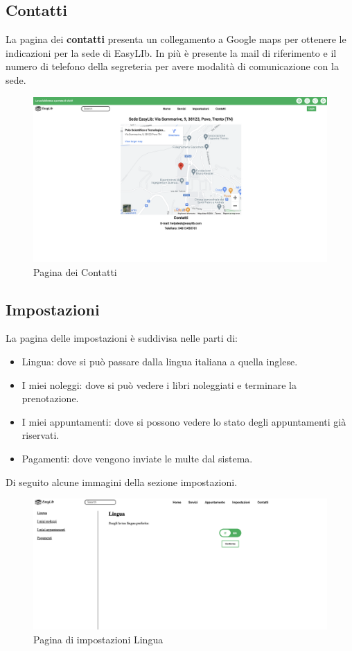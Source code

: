 \documentclass{article}
\begin{document}
\subsection{Contatti}
La pagina dei \textbf{contatti} presenta un collegamento a Google maps per ottenere le indicazioni per la sede di EasyLIb. In più è presente la mail di riferimento e il numero di telefono della segreteria per avere modalità di  comunicazione con la sede.

\begin{figure}[H]
    \centering
    \includegraphics[width=130mm]{D4/Images/Contatti.png}
    \caption{Pagina dei Contatti}
\end{figure}
\subsection{Impostazioni} La pagina delle impostazioni è suddivisa nelle parti di:
\begin{itemize}
    \item Lingua: dove si può passare dalla lingua italiana a quella inglese.
    \item I miei noleggi: dove si può vedere  i libri noleggiati e terminare la prenotazione.
    \item I miei appuntamenti: dove si possono vedere lo stato degli appuntamenti già riservati.
    \item Pagamenti: dove vengono inviate le multe dal  sistema.
\end{itemize}
 Di seguito alcune immagini della sezione impostazioni.

\begin{figure}[H]
    \centering
    \includegraphics[width=130mm]{D4/Images/Lingua.png}
    \caption{Pagina di impostazioni Lingua}
\end{figure}
\end{document}
